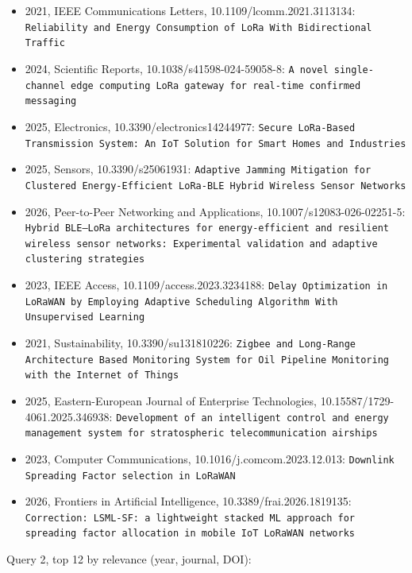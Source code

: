 \begin{itemize}
\item 2021, IEEE Communications Letters, 10.1109/lcomm.2021.3113134: \texttt{Reliability and Energy Consumption of LoRa With Bidirectional Traffic}
\item 2024, Scientific Reports, 10.1038/s41598-024-59058-8: \texttt{A novel single-channel edge computing LoRa gateway for real-time confirmed messaging}
\item 2025, Electronics, 10.3390/electronics14244977: \texttt{Secure LoRa-Based Transmission System: An IoT Solution for Smart Homes and Industries}
\item 2025, Sensors, 10.3390/s25061931: \texttt{Adaptive Jamming Mitigation for Clustered Energy-Efficient LoRa-BLE Hybrid Wireless Sensor Networks}
\item 2026, Peer-to-Peer Networking and Applications, 10.1007/s12083-026-02251-5: \texttt{Hybrid BLE--LoRa architectures for energy-efficient and resilient wireless sensor networks: Experimental validation and adaptive clustering strategies}
\item 2023, IEEE Access, 10.1109/access.2023.3234188: \texttt{Delay Optimization in LoRaWAN by Employing Adaptive Scheduling Algorithm With Unsupervised Learning}
\item 2021, Sustainability, 10.3390/su131810226: \texttt{Zigbee and Long-Range Architecture Based Monitoring System for Oil Pipeline Monitoring with the Internet of Things}
\item 2025, Eastern-European Journal of Enterprise Technologies, 10.15587/1729-4061.2025.346938: \texttt{Development of an intelligent control and energy management system for stratospheric telecommunication airships}
\item 2023, Computer Communications, 10.1016/j.comcom.2023.12.013: \texttt{Downlink Spreading Factor selection in LoRaWAN}
\item 2026, Frontiers in Artificial Intelligence, 10.3389/frai.2026.1819135: \texttt{Correction: LSML-SF: a lightweight stacked ML approach for spreading factor allocation in mobile IoT LoRaWAN networks}
\end{itemize}

Query 2, top 12 by relevance (year, journal, DOI):

